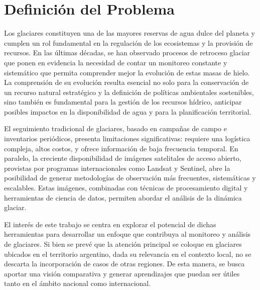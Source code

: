 \documentclass{article}
\begin{document}
\section{Definición del Problema}

Los glaciares constituyen una de las mayores reservas de agua dulce del planeta y cumplen un rol fundamental en la regulación de los ecosistemas y la provisión de recursos. En las últimas décadas, se han observado procesos de retroceso glaciar que ponen en evidencia la necesidad de contar un monitoreo constante y sistemático que permita comprender mejor la evolución de estas masas de hielo. La comprensión de su evolución resulta esencial no solo para la conservación de un recurso natural estratégico y la definición de políticas ambientales sostenibles, sino también es fundamental para la gestión de los recursos hídrico, anticipar posibles impactos en la disponibilidad de agua y para la planificación territorial.

El seguimiento tradicional de glaciares, basado en campañas de campo e inventarios periódicos, presenta limitaciones significativas: requiere una logística compleja, altos costos, y ofrece información de baja frecuencia temporal. En paralelo, la creciente disponibilidad de imágenes satelitales de acceso abierto, provistas por programas internacionales como Landsat y Sentinel, abre la posibilidad de generar metodologías de observación más frecuentes, sistemáticas y escalables. Estas imágenes, combinadas con técnicas de procesamiento digital y herramientas de ciencia de datos, permiten abordar el análisis de la dinámica glaciar.

El interés de este trabajo se centra en explorar el potencial de dichas herramientas para desarrollar un enfoque que contribuya al monitoreo y análisis de glaciares. Si bien se prevé que la atención principal se coloque en glaciares ubicados en el territorio argentino, dada su relevancia en el contexto local, no se descarta la incorporación de casos de otras regiones. De esta manera, se busca aportar una visión comparativa y generar aprendizajes que puedan ser útiles tanto en el ámbito nacional como internacional.
\end{document}
